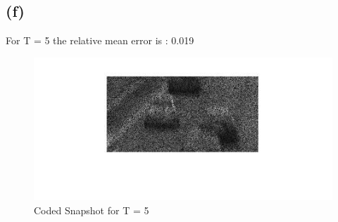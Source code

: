\documentclass{article}
\begin{document}
\subsection{(f)}
For T = 5 the relative mean error is : 0.019
\begin{figure}[!htb]
\centering
\includegraphics[width=1\textwidth]{t7/coded.jpg}
\caption{Coded Snapshot for T = 5}
\end{figure}
\end{document}
